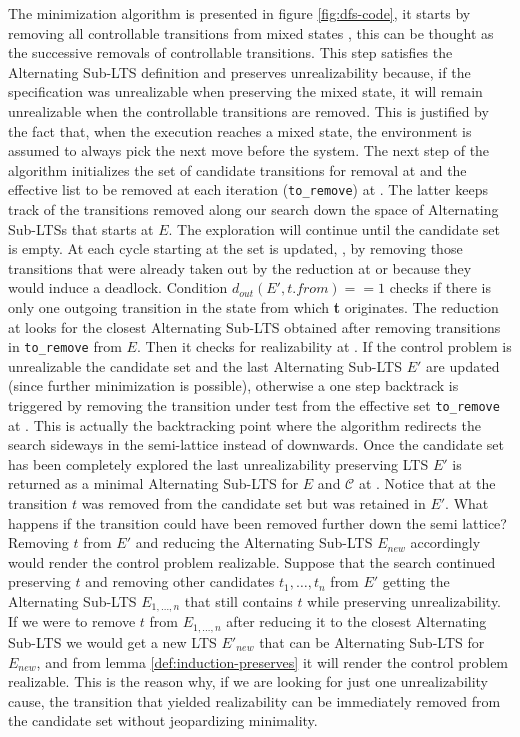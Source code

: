 The minimization algorithm is
presented in figure \ref{fig:dfs-code}, it starts by removing all controllable transitions from
mixed states , this can be thought as the successive removals of controllable 
transitions. This step satisfies the Alternating Sub-LTS definition 
and preserves unrealizability because, if the specification was unrealizable
when preserving the mixed state, it will remain unrealizable when the controllable transitions are removed.  This is justified by the fact that, when the execution reaches a mixed state, the environment
is assumed to always pick the next move before the system.
The next step of the algorithm initializes the set of 
candidate transitions
for removal at  and the effective list
to be removed at each iteration (\texttt{to\_remove}) at
.  The latter keeps track of the transitions
removed along our search down the space of
Alternating Sub-LTSs that starts at $E$.  The exploration
will continue until the candidate set is empty.
At each cycle starting at  the set is updated, , by 
removing those transitions that were already taken out by the reduction
at  or because they would induce a deadlock. Condition 
$d_{out}(E', t.from) == 1$ checks if there is only one
outgoing transition in the state from which \textbf{t} originates.
The
reduction at  looks for the closest
Alternating Sub-LTS obtained after removing 
transitions in \texttt{to\_remove} from $E$.
Then it checks for realizability at .  If the control problem is 
unrealizable the candidate set and the last 
Alternating Sub-LTS $E'$ are updated (since further minimization is 
possible), otherwise a one step backtrack
is triggered by removing the transition under test from
the effective set \texttt{to\_remove} at .
This is actually the backtracking point where the algorithm
redirects the search sideways in the semi-lattice instead of downwards.
Once the candidate set has been completely explored
the last unrealizability preserving LTS $E'$ is
returned as a minimal Alternating Sub-LTS
for $E$ and $\mathcal{C}$ at .
Notice that
at  the transition $t$ was removed
from the candidate set but was retained in $E'$.  What happens if
the transition could have been removed further down the semi lattice?  Removing $t$ from $E'$ and reducing the Alternating Sub-LTS 
$E_{new}$ accordingly would render the control problem realizable.  Suppose that
the search continued preserving $t$ and removing other candidates
$t_1, \ldots, t_n$ from $E'$ getting the Alternating Sub-LTS
$E_{1,\ldots,n}$ that still contains $t$ while preserving unrealizability.
If we were to remove $t$ from $E_{1,\ldots,n}$ after reducing it
to the closest Alternating Sub-LTS we would get a new LTS
$E'_{new}$ that can be Alternating Sub-LTS for $E_{new}$, and from lemma
\ref{def:induction-preserves} it will render the control problem
realizable.  This is the reason why, if we are looking for just one
unrealizability cause, the transition that yielded realizability can be immediately removed 
from the candidate set without jeopardizing minimality.
%


